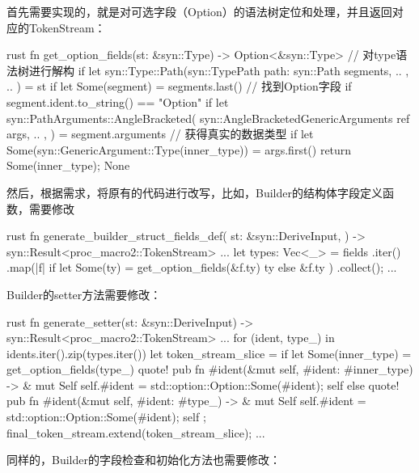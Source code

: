 首先需要实现的，就是对可选字段（Option）的语法树定位和处理，并且返回对应的TokenStream：
\begin{code-block}{rust}
fn get_option_fields(st: &syn::Type) -> Option<&syn::Type> {
    // 对type语法树进行解构
    if let syn::Type::Path(syn::TypePath {
        path: syn::Path { segments, .. },
        ..
    }) = st
    {
        if let Some(segment) = segments.last() {
            // 找到Option字段
            if segment.ident.to_string() == "Option" {
                {
                    if let syn::PathArguments::AngleBracketed(
                        syn::AngleBracketedGenericArguments { ref args, .. },
                    ) = segment.arguments
                    {
                        // 获得真实的数据类型
                        if let Some(syn::GenericArgument::Type(inner_type)) = args.first() {
                            return Some(inner_type);
                        }
                    }
                }
            }
        }
    }
    None
}
\end{code-block}
然后，根据需求，将原有的代码进行改写，比如，Builder的结构体字段定义函数，需要修改
\begin{code-block}{rust}
fn generate_builder_struct_fields_def(
    st: &syn::DeriveInput,
) -> syn::Result<proc_macro2::TokenStream> {
    ...
    let types: Vec<_> = fields
        .iter()
        .map(|f| {
            if let Some(ty) = get_option_fields(&f.ty) {
                ty
            } else {
                &f.ty
            }
        })
        .collect();
    ...
}
\end{code-block}
Builder的setter方法需要修改：
\begin{code-block}{rust}
fn generate_setter(st: &syn::DeriveInput) -> syn::Result<proc_macro2::TokenStream> {
    ...
    for (ident, type_) in idents.iter().zip(types.iter()) {
        let token_stream_slice = if let Some(inner_type) = get_option_fields(type_) {
            quote! {
                pub fn #ident(&mut self, #ident: #inner_type) -> & mut Self {
                    self.#ident = std::option::Option::Some(#ident);
                    self
                }
            }
        } else {
            quote! {
                pub fn #ident(&mut self, #ident: #type_) -> & mut Self {
                    self.#ident = std::option::Option::Some(#ident);
                    self
                }
            }
        };
        final_token_stream.extend(token_stream_slice);
    }
    ...
}
\end{code-block}
同样的，Builder的字段检查和初始化方法也需要修改：
